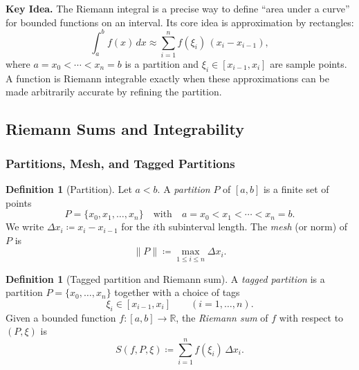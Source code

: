 \documentclass[12pt]{article}
\numberwithin{equation}{section}
\def\diff{d}
\newcommand{\RR}{\mathbb{R}}
\newcommand{\diff}{\mathop{}\!\mathrm{d}}    %
\theoremstyle{plain}
\theoremstyle{definition}
\newtheorem{definition}[theorem]{Definition}
\theoremstyle{remark}
\newenvironment{keyidea}{\begin{tcolorbox}\textbf{Key Idea.}}{\end{tcolorbox}}
\begin{document}
\begin{keyidea}
The Riemann integral is a precise way to define ``area under a curve'' for bounded functions on an interval.
Its core idea is approximation by rectangles:
\[
\int_a^b f(x)\,\diff x \approx \sum_{i=1}^n f(\xi_i)\,(x_i-x_{i-1}),
\]
where $a=x_0<\cdots<x_n=b$ is a partition and $\xi_i\in[x_{i-1},x_i]$ are sample points.
A function is Riemann integrable exactly when these approximations can be made arbitrarily accurate by refining the partition.
\end{keyidea}

\subsection{Riemann Sums and Integrability}

\subsubsection{Partitions, Mesh, and Tagged Partitions}

\begin{definition}[Partition]\label{def:partition}
Let $a<b$. A \emph{partition} $P$ of $[a,b]$ is a finite set of points
\[
P=\{x_0,x_1,\dots,x_n\}\quad\text{with}\quad a=x_0<x_1<\cdots<x_n=b.
\]
We write $\Delta x_i \coloneqq x_i-x_{i-1}$ for the $i$th subinterval length.
The \emph{mesh} (or norm) of $P$ is
\[
\|P\|\coloneqq \max_{1\le i\le n}\Delta x_i.
\]
\end{definition}

\begin{definition}[Tagged partition and Riemann sum]\label{def:tagged}
A \emph{tagged partition} is a partition $P=\{x_0,\dots,x_n\}$ together with a choice of tags
\[
\xi_i\in[x_{i-1},x_i]\qquad (i=1,\dots,n).
\]
Given a bounded function $f:[a,b]\to\RR$, the \emph{Riemann sum} of $f$ with respect to $(P,\xi)$ is
\[
S(f,P,\xi)\coloneqq \sum_{i=1}^n f(\xi_i)\,\Delta x_i.
\]
\end{definition}
\end{document}
